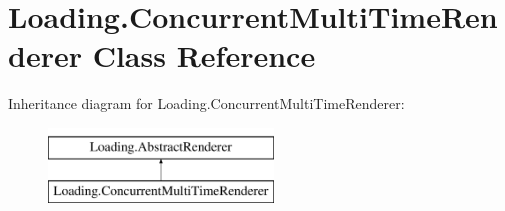 \hypertarget{class_loading_1_1_concurrent_multi_time_renderer}{}\section{Loading.\+Concurrent\+Multi\+Time\+Renderer Class Reference}
\label{class_loading_1_1_concurrent_multi_time_renderer}
Inheritance diagram for Loading.\+Concurrent\+Multi\+Time\+Renderer\+:\begin{figure}[H]
\begin{center}
\leavevmode
\includegraphics[height=2.000000cm]{class_loading_1_1_concurrent_multi_time_renderer}
\end{center}
\end{figure}
